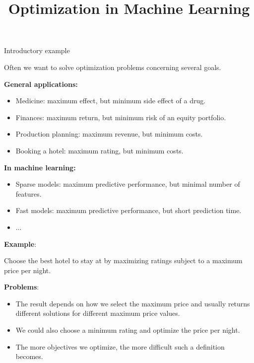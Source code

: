 \documentclass[11pt,compress,t,notes=noshow, xcolor=table]{beamer}
\title{Optimization in Machine Learning}
\date{}
\begin{document}
\sloppy


\begin{vbframe}{Introductory example}

Often we want to solve optimization problems concerning several goals.

\vspace{0.5cm}
    \textbf{General applications:}
\begin{itemize}
\item Medicine: maximum effect, but minimum side effect of a drug.
\item Finances: maximum return, but minimum risk of an equity portfolio.
\item Production planning: maximum revenue, but minimum costs.
\item Booking a hotel: maximum rating, but minimum costs.
\end{itemize}

\vspace{0.5cm}
    \textbf{In machine learning:}
\begin{itemize}
\item Sparse models: maximum predictive performance, but minimal number of features.
\item Fast models: maximum predictive performance, but short prediction time.
\item ...
\end{itemize}

\framebreak

\textbf{Example}:

Choose the best hotel to stay at by maximizing ratings subject to a maximum price per night.

\vspace{0.5cm}
 \textbf{Problems}:

\footnotesize
\begin{itemize}
 \item The result depends on how we select the maximum price and usually returns different solutions for different maximum price values.
 \item We could also choose a minimum rating and optimize the price per night.
 \item The more objectives we optimize, the more difficult such a definition becomes.
\end{itemize}


\end{vbframe}
\end{document}
